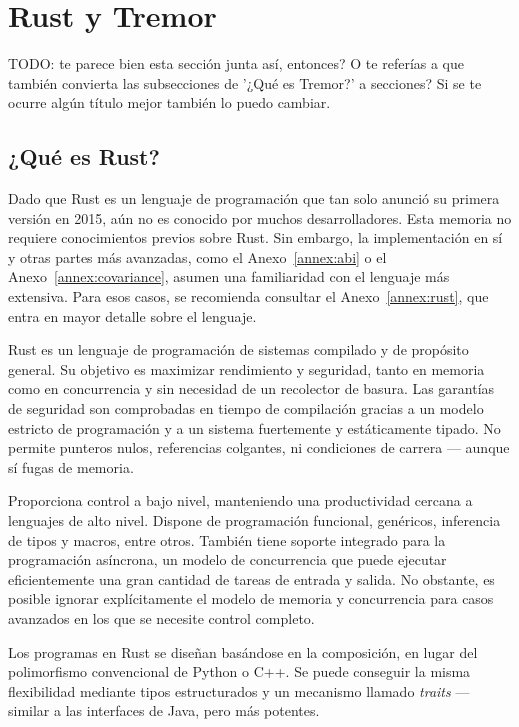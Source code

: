 
\chapter{Rust y Tremor}

TODO: te parece bien esta sección junta así, entonces? O te referías a que
también convierta las subsecciones de '¿Qué es Tremor?' a secciones? Si se te
ocurre algún título mejor también lo puedo cambiar.

\section{¿Qué es Rust?}\label{sec:rust}

Dado que Rust es un lenguaje de programación que tan solo anunció su primera
versión en 2015, aún no es conocido por muchos desarrolladores. Esta memoria no
requiere conocimientos previos sobre Rust. Sin embargo, la implementación en sí
y otras partes más avanzadas, como el Anexo~\ref{annex:abi} o el
Anexo~\ref{annex:covariance}, asumen una familiaridad con el lenguaje más
extensiva. Para esos casos, se recomienda consultar el Anexo~\ref{annex:rust},
que entra en mayor detalle sobre el lenguaje.

Rust es un lenguaje de programación de sistemas compilado y de propósito
general. Su objetivo es maximizar rendimiento y seguridad, tanto en memoria como
en concurrencia y sin necesidad de un recolector de basura. Las garantías de
seguridad son comprobadas en tiempo de compilación gracias a un modelo estricto
de programación y a un sistema fuertemente y estáticamente tipado. No permite
punteros nulos, referencias colgantes, ni condiciones de carrera --- aunque sí
fugas de memoria.

Proporciona control a bajo nivel, manteniendo una productividad cercana a
lenguajes de alto nivel. Dispone de programación funcional, genéricos,
inferencia de tipos y macros, entre otros. También tiene soporte integrado para
la programación asíncrona, un modelo de concurrencia que puede ejecutar
eficientemente una gran cantidad de tareas de entrada y salida. No obstante, es
posible ignorar explícitamente el modelo de memoria y concurrencia para casos
avanzados en los que se necesite control completo.

Los programas en Rust se diseñan basándose en la composición, en lugar del
polimorfismo convencional de Python o C++. Se puede conseguir la misma
flexibilidad mediante tipos estructurados y un mecanismo llamado \emph{traits}
--- similar a las interfaces de Java, pero más potentes.

